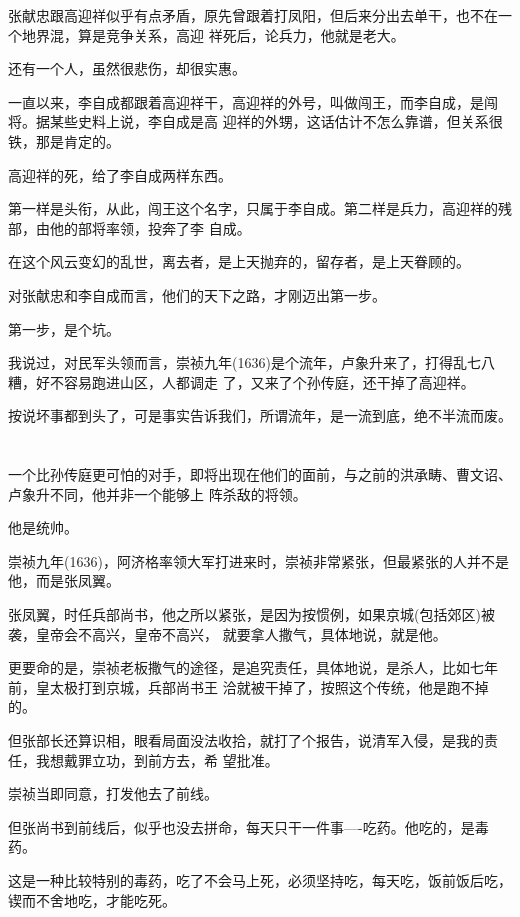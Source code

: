 \documentclass[11pt,a4paper,onecolumn]{article}
\begin{document}
张献忠跟高迎祥似乎有点矛盾，原先曾跟着打凤阳，但后来分出去单干，也不在一个地界混，算是竞争关系，高迎
祥死后，论兵力，他就是老大。

还有一个人，虽然很悲伤，却很实惠。

一直以来，李自成都跟着高迎祥干，高迎祥的外号，叫做闯王，而李自成，是闯将。据某些史料上说，李自成是高
迎祥的外甥，这话估计不怎么靠谱，但关系很铁，那是肯定的。

高迎祥的死，给了李自成两样东西。

第一样是头衔，从此，闯王这个名字，只属于李自成。第二样是兵力，高迎祥的残部，由他的部将率领，投奔了李
自成。

在这个风云变幻的乱世，离去者，是上天抛弃的，留存者，是上天眷顾的。

对张献忠和李自成而言，他们的天下之路，才刚迈出第一步。

第一步，是个坑。

我说过，对民军头领而言，崇祯九年(1636)是个流年，卢象升来了，打得乱七八糟，好不容易跑进山区，人都调走
了，又来了个孙传庭，还干掉了高迎祥。

按说坏事都到头了，可是事实告诉我们，所谓流年，是一流到底，绝不半流而废。

\section[\thesection]{}

一个比孙传庭更可怕的对手，即将出现在他们的面前，与之前的洪承畴、曹文诏、卢象升不同，他并非一个能够上
阵杀敌的将领。

他是统帅。

崇祯九年(1636)，阿济格率领大军打进来时，崇祯非常紧张，但最紧张的人并不是他，而是张凤翼。

张凤翼，时任兵部尚书，他之所以紧张，是因为按惯例，如果京城(包括郊区)被袭，皇帝会不高兴，皇帝不高兴，
就要拿人撒气，具体地说，就是他。

更要命的是，崇祯老板撒气的途径，是追究责任，具体地说，是杀人，比如七年前，皇太极打到京城，兵部尚书王
洽就被干掉了，按照这个传统，他是跑不掉的。

但张部长还算识相，眼看局面没法收拾，就打了个报告，说清军入侵，是我的责任，我想戴罪立功，到前方去，希
望批准。

崇祯当即同意，打发他去了前线。

但张尚书到前线后，似乎也没去拼命，每天只干一件事----吃药。他吃的，是毒药。

这是一种比较特别的毒药，吃了不会马上死，必须坚持吃，每天吃，饭前饭后吃，锲而不舍地吃，才能吃死。
\end{document}
